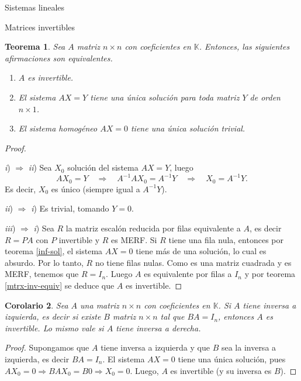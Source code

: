 \documentclass[a4paper,12pt,twoside,spanish]{amsbook}
\newtheorem{teorema}{Teorema}[section]
\newtheorem{corolario}[teorema]{Corolario}
\theoremstyle{definition}
\theoremstyle{remark}
\newcommand{\K}{\mathbb K}
\begin{document}
\begin{chapter}{Sistemas lineales}
\begin{section}{Matrices invertibles}
			
			\begin{teorema}\label{mtrx-inv-equiv2} 
				Sea $A$ matriz $n \times n$ con coeficientes en $\K$. Entonces,  las siguientes afirmaciones son equivalentes. 
				\begin{enumerate}
					\item[\textit{i})] $A$ es invertible.
					\item[\textit{ii})] El sistema $AX=Y$ tiene una única solución para toda matriz $Y$ de orden $n \times 1$. 
					\item[\textit{iii})] El sistema homogéneo $AX=0$ tiene una única solución trivial.
				\end{enumerate}
			\end{teorema}
			\begin{proof}
				
				\
				
				\textit{i}) $\Rightarrow$  \textit{ii}) Sea $X_0$ solución del sistema $AX=Y$, luego
				\begin{equation*}
				AX_0=Y  \quad \Rightarrow \quad  A^{-1}AX_0 = A^{-1}Y  \quad \Rightarrow \quad  X_0 = A^{-1}Y.
				\end{equation*}
				Es decir, $X_0$ es único (siempre igual  a $A^{-1}Y$).  
				
				
				\textit{ii}) $\Rightarrow$  \textit{i}) Es trivial, tomando $Y =0$.
				
				
				
				\textit{iii}) $\Rightarrow$  \textit{i}) Sea $R$ la matriz escalón reducida por filas equivalente a $A$, es decir $R=PA$ con $P$ invertible y $R$ es MERF. Si $R$ tiene una fila nula, entonces por teorema \ref{inf-sol},  el sistema $AX =0$ tiene más de una solución, lo cual es absurdo.  Por lo tanto, $R$ no tiene filas nulas. Como es una matriz cuadrada y es MERF, tenemos que $R=I_n$. Luego $A$ es equivalente por filas a $I_n$ y por teorema \ref{mtrx-inv-equiv} se deduce que $A$ es invertible. 			
				
			\end{proof}
			
			\begin{corolario}
				Sea $A$ una matriz $n \times n$ con coeficientes  en $\K$. Si $A$ tiene inversa a izquierda,  es decir si existe $B$ matriz $n \times n$ tal que $BA=I_n$,   entonces $A$ es invertible.  Lo mismo vale si $A$ tiene inversa a derecha. 
			\end{corolario}	
			\begin{proof}
				Supongamos que  $A$ tiene inversa a izquierda y  que $B$ sea la inversa a izquierda,  es decir $BA=I_n$. El sistema $AX=0$ tiene una única solución, pues $AX_0=0 \Rightarrow BAX_0=B0 \Rightarrow X_0=0$. Luego, $A$  es invertible (y su inversa es $B$). 
				

\end{proof}
\end{section}
\end{chapter}
\end{document}
